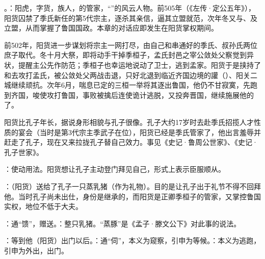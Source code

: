 {
\item {}。：阳虎，字货，族人，的管家，“”的风云人物。前505年（《左传·定公五年》），阳货囚禁了季氏新任的第5代宗主，逐杀其亲信，逼其立盟就范，次年冬又与、及立盟，从而掌握了鲁国国政。本章的对话应即发生在阳货掌权期间。%

前502年，阳货进一步谋划将宗主一网打尽，由自己和串通好的季氏、叔孙氏两位庶子取代。冬十月大祭，即将动手干掉季桓子，孟氏封邑之宰公敛处父察觉到异状，提醒主公先作防范；季桓子也幸运地说动了卫士，逃到孟家。阳货于是挟持了和去攻打孟氏，被公敛处父两战击退，只好北退到临近齐国边境的讙（）、阳关二城继续顽抗。次年6月，喘息已定的三桓一举将其逐出鲁国，他仍不甘寂寞，先跑到齐国，唆使攻打鲁国，事败被擒后连使诡计逃脱，又投奔晋国，继续施展他的了。

阳货比孔子年长，据说身形相貌与孔子很像。孔子大约17岁时去赴季氏招揽人才性质的宴会（当时是第3代宗主季武子在位），阳货已经是季氏管家了，他出言羞辱并赶走了孔子，现在又来拉拢孔子替自己效力。事见《史记·鲁周公世家》、《史记·孔子世家》。

：使动用法。阳货想让孔子主动登门拜见自己，形式上表示臣服顺从。

\item {}：（阳货）送给了孔子一只蒸乳猪（作为礼物）。目的是让孔子出于礼节不得不回拜他。当时孔子尚未出仕，身份是继承的，而阳货是正卿季桓子的管家，又掌控鲁国实权，地位不低于大夫。

：通“馈”，赠送。：整只乳猪。“蒸豚”是《孟子·滕文公下》对此事的说法。%

\item {}：等到他（阳货）出门以后。：通“伺”，本义为窥察，引申为等候。：本义为逃跑，引申为外出，出门。

}
